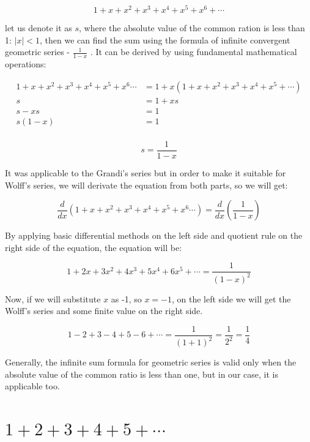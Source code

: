 \documentclass[a4paper]{article}
\begin{document}
\begin{equation*}
1+x+x^2+x^3+x^4+x^5+x^6+\cdots
\end{equation*}

let us denote it as \(s\),
where the absolute value of the common ration is less than 1: \(|x| < 1\), then we
can find the sum using the formula of infinite convergent geometric series -
\(\frac{1}{1-x}\) . It can be derived by using fundamental mathematical
operations: 

\begin{align*}
  1+x+x^2+x^3+x^4+x^5+x^6\cdots&=1+x(1+x+x^2+x^3+x^4+x^5+\cdots)\\
  s&=1+xs\\
  s-xs&=1\\
  s(1-x)&=1\\
\end{align*}

\begin{equation}
  s=\frac{1}{1-x}
  \end{equation}

It was applicable to the Grandi's series but in order to make it suitable for
Wolff's series, we will derivate the equation from both parts, so we will get: 

\begin{equation*}
  \frac{d}{dx}(1+x+x^2+x^3+x^4+x^5+x^6\cdots)=\frac{d}{dx}(\frac{1}{1-x})
  \end{equation*}

By applying basic differential methods on the left side and quotient rule on the
right side of the equation, the equation will be:

\begin{equation*}
  1+2x+3x^2+4x^3+5x^4+6x^5+\cdots=\frac{1}{(1-x)^2}
  \end{equation*}

Now, if we will substitute \(x\) as -1, so \(x=-1\), on the left side we will get
the Wolff's series and some finite value on the right side.

\begin{equation}
  1-2+3-4+5-6+\cdots=\frac{1}{(1+1)^2}=\frac{1}{2^2}=\frac{1}{4}
  \label{Wolff}
\end{equation}

Generally, the infinite sum formula for geometric series is valid only when the
absolute value of the common ratio is less than one, but in our case, it is
applicable too. 

\section{\(1+2+3+4+5+\cdots\)}
\label{sec:orge390db7}
\end{document}
